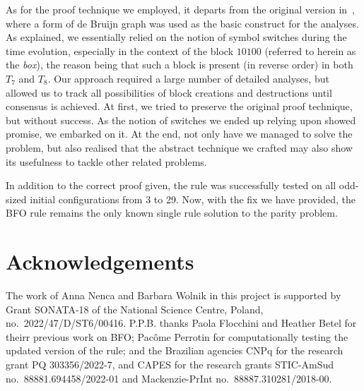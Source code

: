 \documentclass{sn-jnl}
\begin{document}
As for the proof technique we employed, it departs from the original version in~\cite{BFO2013}, where a form of de Bruijn graph was used as the basic construct for the analyses. As explained, we essentially relied on the notion of symbol switches during the time evolution, especially in the context of the block $10100$ (referred to herein as the \emph{box}), the reason being that such a block is present (in reverse order) in both $T_7$ and $T_8$. Our approach required a large number of detailed analyses, but allowed us to track all possibilities of block creations and destructions until consensus is achieved. At first, we tried to preserve the original proof technique, but without success. As the notion of switches we ended up relying upon showed promise, we embarked on it. At the end, not only have we managed to solve the problem, but also realised that the abstract technique we crafted may also show its usefulness to tackle other related problems.

In addition to the correct proof given, the rule was successfully tested on all odd-sized initial configurations from 3 to 29. Now, with the fix we have provided, the BFO rule remains the only known single rule solution to the parity problem.


\section*{Acknowledgements}
\noindent
The work of Anna Nenca and Barbara Wolnik in this project is supported by Grant SONATA-18  of the National Science Centre, Poland, no.\ 2022/47/D/ST6/00416.
\noindent P.P.B. thanks Paola Flocchini and Heather Betel for theirr previous work on BFO; Pac\^{o}me Perrotin for computationally testing the updated version of the rule; and the Brazilian agencies CNPq for the research grant PQ 303356/2022-7, and CAPES for the research grants STIC-AmSud no.\ 88881.694458/2022-01 and Mackenzie-PrInt no.\ 88887.310281/2018-00.

% 

% 
\printbibliography
\end{document}
